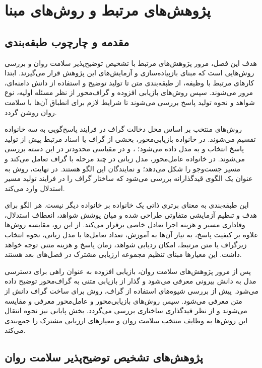 \chapter{پژوهش‌های مرتبط و روش‌های مبنا}

\section{مقدمه و چارچوب طبقه‌بندی}

هدف این فصل، مرور پژوهش‌های مرتبط با تشخیص توضیح‌پذیر سلامت روان و بررسی روش‌هایی است که مبنای بازپیاده‌سازی و آزمایش‌های این پژوهش قرار می‌گیرند. ابتدا کارهای مرتبط با وظیفه، از طبقه‌بندی متن تا تولید توضیح و استفاده از دانش دامنه‌ای، مرور می‌شوند. سپس روش‌های بازیابی افزوده و گراف‌محور از نظر مسئله اولیه، نوع شواهد و نحوه تولید پاسخ بررسی می‌شوند تا شرایط لازم برای انطباق آن‌ها با سلامت روان روشن گردد.

روش‌های منتخب بر اساس محل دخالت گراف در فرایند پاسخ‌گویی به سه خانواده تقسیم می‌شوند. در خانواده بازیابی‌محور، بخشی از گراف یا اسناد مرتبط پیش از تولید پاسخ انتخاب و به مدل داده می‌شود؛ ،  و در مقیاسی محدودتر  در این دسته بررسی می‌شوند. در خانواده عامل‌محور، مدل زبانی در چند مرحله با گراف تعامل می‌کند و مسیر جست‌وجو را شکل می‌دهد؛  و  نمایندگان این الگو هستند. در نهایت، روش  به عنوان یک الگوی قیدگذارانه بررسی می‌شود که ساختار گراف را در فرایند تولید مسیر استدلال وارد می‌کند.

این طبقه‌بندی به معنای برتری ذاتی یک خانواده بر خانواده دیگر نیست. هر الگو برای هدف و تنظیم آزمایشی متفاوتی طراحی شده و میان پوشش شواهد، انعطاف استدلال، وفاداری مسیر و هزینه اجرا تعادل خاصی برقرار می‌کند. از این رو، مقایسه روش‌ها علاوه بر کیفیت پاسخ، به نیاز آن‌ها به آموزش، تعداد تعامل‌ها با مدل زبانی، نحوه انتخاب زیرگراف یا متن مرتبط، امکان ردیابی شواهد، زمان پاسخ و هزینه متنی توجه خواهد داشت. این معیارها مبنای تنظیم مجموعه ارزیابی مشترک در فصل‌های بعد هستند.

پس از مرور پژوهش‌های سلامت روان، بازیابی افزوده به عنوان راهی برای دسترسی مدل به دانش بیرونی معرفی می‌شود و گذار از بازیابی متنی به گراف‌محور توضیح داده می‌شود. پیش از بررسی شیوه‌های استفاده از گراف، روش  برای ساخت گراف دانش از متن معرفی می‌شود. سپس روش‌های بازیابی‌محور و عامل‌محور معرفی و مقایسه می‌شوند و  از نظر قیدگذاری ساختاری بررسی می‌گردد. بخش پایانی نیز نحوه انتقال این روش‌ها به وظایف منتخب سلامت روان و معیارهای ارزیابی مشترک را جمع‌بندی می‌کند.

\section{پژوهش‌های تشخیص توضیح‌پذیر سلامت روان}

